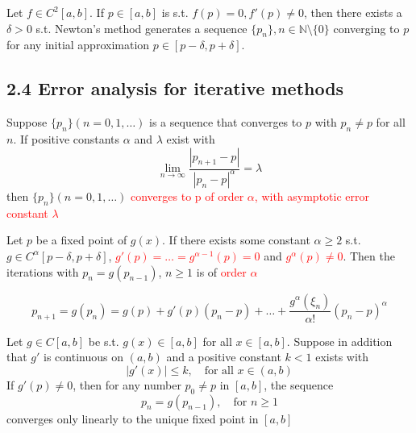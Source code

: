 \documentclass[11pt]{article}
\begin{document}
\begin{theorem}
Let $f\in C^2[a,b]$. If $p\in[a,b]$ is s.t. $f(p)=0,f'(p)\neq0$, then there
exists a $\delta>0$ s.t. Newton's method generates a sequence $\{p_n\},
n\in\mathbb{N}\setminus\{0\}$ converging to $p$ for any initial approximation
$p\in[p-\delta,p+\delta]$.
\end{theorem}
\subsection{2.4 Error analysis for iterative methods}
\label{sec:orgcb80e2d}
\begin{definition}
Suppose $\{p_n\}(n=0,1,\dots)$ is a sequence that converges to $p$ with
$p_n\neq p$ for all $n$. If positive constants $\alpha$ and $\lambda$ exist
with
\begin{equation*}
\lim\limits_{n\to\infty}\frac{|p_{n+1}-p|}{|p_n-p|^\alpha}=\lambda
\end{equation*}
then $\{p_n\}(n=0,1,\dots)$ \textcolor{red}{converges to p of order
$\alpha$, with asymptotic error constant $\lambda$}
\end{definition}

\begin{theorem}
Let $p$ be a fixed point of $g(x)$. If there exists some constant $\alpha\ge
2$ s.t. $g\in C^\alpha[p-\delta,p+\delta]$,
\textcolor{red}{$g'(p)=\dots=g^{\alpha-1}(p)=0$} and \textcolor{red}{$g^\alpha(p)\neq 0$}.
Then the iterations with $p_n=g(p_{n-1})$, $n\ge1$ is of \textcolor{red}{order $\alpha$}
\end{theorem}

\begin{equation*}
p_{n+1}=g(p_n)=g(p)+g'(p)(p_n-p)+\dots+\frac{g^\alpha(\xi_n)}{\alpha!}(p_n-p)^\alpha
\end{equation*}

\begin{theorem}
Let $g\in C[a,b]$ be s.t. $g(x)\in[a,b]$ for all $x\in[a,b]$. Suppose in
addition that $g'$ is continuous on $(a,b)$ and a positive constant $k<1$
exists with
\begin{equation*}
|g'(x)|\le k, \quad \text{for all } x\in(a,b)
\end{equation*}
If $g'(p)\neq0$, then for any number $p_0\neq p$ in $[a,b]$, the sequence
\begin{equation*}
p_n=g(p_{n-1}),\quad\text{for }n\ge 1
\end{equation*}
converges only linearly to the unique fixed point in $[a,b]$
\end{theorem}
\end{document}

